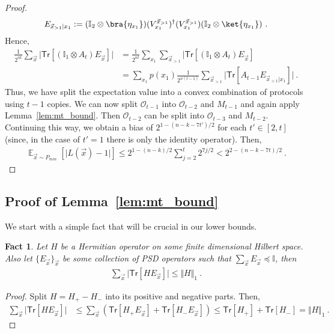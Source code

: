 \documentclass[11pt]{article}
\newtheorem{fact}[theorem]{Fact}
\newcommand{\E}{\mathop{\mathbb{E}}}
\newcommand{\id}{\ensuremath{\mathbb{I}}}
\newcommand{\Tr}{\mathsf{Tr}}
\newcommand{\Oc}{\mathcal{O}}
\begin{document}
\begin{proof}
\begin{align}
        E_{\vec{x}_{>1} \vert x_1} : = (\id_2 \otimes \bra{\eta_{x_1}}) (V_{x_1}^{\vec{x}_{>1}})^\dagger (V_{x_1}^{\vec{x}_{>1}})(\id_2 \otimes \ket{\eta_{x_1}})\ .
    \end{align}
    Hence, 
    \begin{align}
        \frac{1}{2^{nt}}\sum_{\vec{x}} \vert\Tr[(\id_1\otimes A_t) E_{\vec{x}}] \vert & = \frac{1}{2^{nt}}\sum_{x_1} \sum_{\vec{x}_{>1}} \vert\Tr[(\id_1\otimes A_t) E_{\vec{x}}]\\
        & = \sum_{x_1} p(x_1) \frac{1}{2^{n(t-1)}}\sum_{\vec{x}_{>1}} \vert \Tr[A_{t-1} E_{\vec{x}_{>1} \vert x_1} ] \vert\ .
    \end{align}
    Thus, we have split the expectation value into a convex combination of protocols using $t-1$ copies. We can now split $\Oc_{t-1}$ into $\Oc_{t-2}$ and $M_{t-1}$ and again apply Lemma~\ref{lem:mt_bound}. Then $\Oc_{t-2}$ can be split into $\Oc_{t-3}$ and $M_{t-2}$. Continuing this way, we obtain a bias of $2^{1-(n-k-7t')/2}$ for each $t' \in [2,t]$ (since, in the case of $t'=1$ there is only the identity operator). Then,
    \begin{align}
        \E_{\vec{x}\sim P_{mm}}[\vert L(\vec{x})-1\vert] \leq 2^{1-(n-k)/2}\sum_{j=2}^t 2^{7j/2}< 2^{2-(n-k-7t)/2}\ .
    \end{align}
\end{proof}



\subsection{Proof of Lemma~\ref{lem:mt_bound}}
\label{sec:lb_tech_proof}

We start with a simple fact that will be crucial in our lower bounds.

\begin{fact}\label{fact:trace_norm_inequality}
    Let $H$ be a Hermitian operator on some finite dimensional Hilbert space. Also let $\{E_{\vec{x}}\}_{\vec{x}}$ be some collection of PSD operators such that $\sum_{\vec{x}} E_{\vec{x}} \preceq \id$, then
    \begin{align}
        \sum_{\vec{x}} \vert \Tr[H E_{\vec{x}}]\vert \leq \Vert H \Vert_1\ .
    \end{align}
\end{fact}
\begin{proof}
    Split $H = H_+ - H_-$ into its positive and negative parts. Then,
    \begin{align}
        \sum_{\vec{x}} \vert \Tr[H E_{\vec{x}}]\vert & \leq \sum_{\vec{x}} (\Tr[H_+ E_{\vec{x}}] + \Tr[H_- E_{\vec{x}}]) \leq \Tr[H_+] + \Tr[H_-] = \Vert H \Vert_1\ .
    \end{align}
\end{proof}
\end{document}
